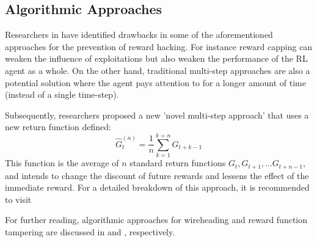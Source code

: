 \subsection{Algorithmic Approaches}
Researchers in \cite{multi-step} have identified drawbacks in some of the aforementioned approaches for the prevention of reward hacking.
For instance reward capping can weaken the influence of exploitations but also weaken the performance of the RL agent as a whole.
On the other hand, traditional multi-step approaches are also a potential solution where the agent pays attention to for a longer amount of time (instead of a single time-step).

Subsequently, researchers proposed a new 'novel multi-step approach' that uses a new return function defined:
\begin{equation}
    \hat{G}_t^{(n)} = \frac{1}{n} \sum^{k=n}_{k=1} G_{t+k-1}
\end{equation}
This function is the average of $n$ standard return functions $G_t, G_{t+1},\dots G_{t+n-1}$, and 
intends to change the discount of future rewards and lessens the effect of the immediate reward.
For a detailed breakdown of this approach, it is recommended to visit \cite{multi-step}

For further reading, algorithmic approaches for wireheading and reward function tampering are discussed 
in \cite{Wireheading} and \cite{DBLP:journals/corr/abs-1908-04734}, respectively.
